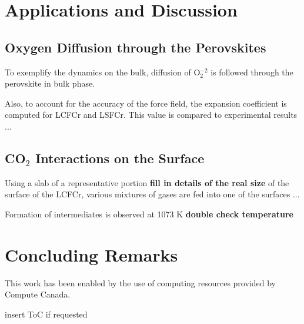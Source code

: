 \documentclass[journal=jpcafh,manuscript=article]{achemso}
\begin{document}
\section{Applications and Discussion}

\subsection{Oxygen Diffusion through the Perovskites}

To exemplify the dynamics on the bulk, diffusion of O$_2^{-2}$ is followed through the perovskite in bulk phase.

Also, to account for the accuracy of the force field, the expansion coefficient is computed for LCFCr and LSFCr.
This value is compared to experimental results ...

\subsection{CO$_2$ Interactions on the Surface}

Using a slab of a representative portion \textbf{fill in details of the real size} of the surface of the LCFCr, various mixtures of gases are fed into one of the surfaces ...

Formation of intermediates is observed at 1073 K \textbf{double check temperature}

\section{Concluding Remarks}


\begin{acknowledgement}
This work has been enabled by the use of computing resources provided by Compute Canada.
\end{acknowledgement}

\pagebreak



\pagebreak
\begin{tocentry}
\begin{center}
insert ToC if requested
\end{center}
\end{tocentry}
\end{document}
